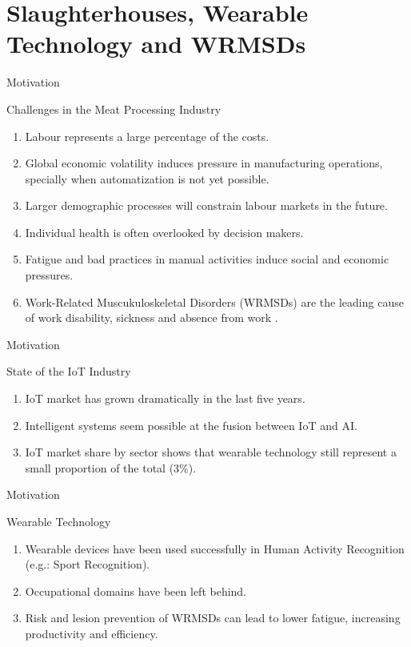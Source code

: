 
\section{Slaughterhouses, Wearable Technology and WRMSDs}
\frame{\sectionpage}

\begin{frame}{Motivation}
    \begin{alertblock}{Challenges in the Meat Processing Industry}
    \begin{enumerate}%
    \item Labour represents a large percentage of the costs.
    \item Global economic volatility induces pressure in manufacturing operations, specially when automatization is not yet possible.
    \item Larger demographic processes will constrain labour markets in the future.
    \item Individual health is often overlooked by decision makers.
    \item Fatigue and bad practices in manual activities induce social and economic pressures. 
    \item Work-Related Muscukuloskeletal Disorders (WRMSDs) are the leading cause of work disability, sickness and absence from work \cite{Bevan2015}.
    \end{enumerate}
    \end{alertblock}
\end{frame}


\begin{frame}{Motivation}{}
    \begin{alertblock}{State of the IoT Industry}
    \begin{enumerate}%
    \item IoT market has grown dramatically in the last five years.
    \item Intelligent systems seem possible at the fusion between IoT and AI.
    \item IoT market share by sector shows that wearable technology still represent a small proportion of the total (3\%).
    \end{enumerate}
    \end{alertblock}
\end{frame}

\begin{frame}{Motivation}
    \begin{alertblock}{Wearable Technology}
    \begin{enumerate}%
    \item Wearable devices have been used successfully in Human Activity Recognition (e.g.: Sport Recognition).
    \item Occupational domains have been left behind. 
    \item Risk and lesion prevention of WRMSDs can lead to lower fatigue, increasing productivity and efficiency.
    \end{enumerate}
    \end{alertblock}
\end{frame}


